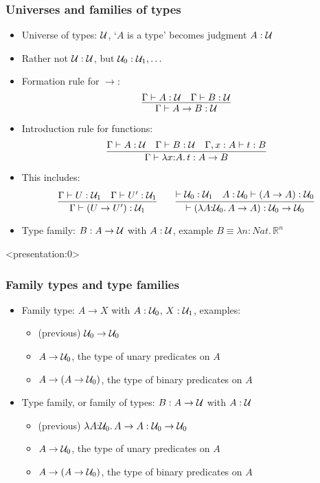 \documentclass[handout]{beamer}
\newcommand{\lamt}[3]{\lambda{#1{:}#2.\,#3}}
\newcommand{\Rea}{\mathbb{R}}
\newcommand{\UU}{{\cal U}}
\newcommand{\Uo}{\UU_0}
\newcommand{\Uu}{\UU_1}
\begin{document}
\frame
  {
  
    \frametitle{Universes and families of types}

    \begin{itemize}[<+->]
    \item Universe of types: $\UU$, `$A$ is a type' becomes judgment $A:\UU$
    \item Rather not $\UU:\UU$, but $\Uo:\Uu,\ldots$
    \item Formation rule for $\to$: %
\[\infer{\Gamma\vdash A\to B : \UU}{\Gamma\vdash A:\UU \quad \Gamma\vdash B:\UU}\]
    \item Introduction rule for functions: %
\[\infer{\Gamma\vdash\lamt{x}{A}{t}:A\to B}
        {\Gamma\vdash A:\UU\quad \Gamma\vdash B:\UU\quad\Gamma,x:A \vdash t:B}\]
    \item This includes:
\[  \infer{\Gamma\vdash (U\to U') : \Uu}{\Gamma\vdash U:\Uu \quad \Gamma\vdash U':\Uu}
\quad\quad
\infer{\vdash(\lamt{A}{\Uo}{A\to A}):\Uo\to \Uo}
        {\vdash \Uo:\Uu\quad A:\Uo \vdash (A\to A):\Uo}
\]
\item Type family: $B : A\to \UU$ with $A:\UU$, example $B\equiv\lamt{n}{Nat}{\Rea^n}$
    \end{itemize}
  }

\begin{frame}<presentation:0>
  
    \frametitle{Family types and type families}

    \begin{itemize}[<+->]
    \item Family type: $A\to X$ with $A:\Uo$, $X:\Uu$, examples:
        \begin{itemize}[<+->]
        \item (previous) $\Uo\to\Uo$
        \item $A \to \Uo$, the type of unary predicates on $A$
        \item $A \to (A\to \Uo)$, the type of binary predicates on $A$
        \end{itemize}    
    \item Type family, or family of types: $B : A\to \UU$ with $A:\UU$
        \begin{itemize}[<+->]
        \item (previous) $\lamt{A}{\Uo}{A\to A}: \Uo\to\Uo$
        \item $A \to \Uo$, the type of unary predicates on $A$
        \item $A \to (A\to \Uo)$, the type of binary predicates on $A$
        \end{itemize}
    \end{itemize}
\end{frame}
\end{document}
